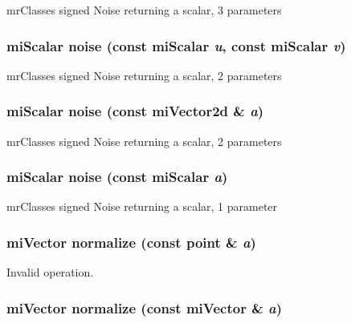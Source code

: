 mr\-Classes signed Noise returning a scalar, 3 parameters 

\subsubsection{\setlength{\rightskip}{0pt plus 5cm}mi\-Scalar noise (const mi\-Scalar {\em u}, const mi\-Scalar {\em v})\hspace{0.3cm}{\tt  [inline]}}\label{namespacersl_a72}


mr\-Classes signed Noise returning a scalar, 2 parameters 

\subsubsection{\setlength{\rightskip}{0pt plus 5cm}mi\-Scalar noise (const mi\-Vector2d \& {\em a})\hspace{0.3cm}{\tt  [inline]}}\label{namespacersl_a71}


mr\-Classes signed Noise returning a scalar, 2 parameters 

\subsubsection{\setlength{\rightskip}{0pt plus 5cm}mi\-Scalar noise (const mi\-Scalar {\em a})\hspace{0.3cm}{\tt  [inline]}}\label{namespacersl_a70}


mr\-Classes signed Noise returning a scalar, 1 parameter 

\subsubsection{\setlength{\rightskip}{0pt plus 5cm}mi\-Vector normalize (const point \& {\em a})\hspace{0.3cm}{\tt  [inline]}}\label{namespacersl_a41}


Invalid operation. 

\subsubsection{\setlength{\rightskip}{0pt plus 5cm}mi\-Vector normalize (const mi\-Vector \& {\em a})\hspace{0.3cm}{\tt  [inline]}}\label{namespacersl_a40}


